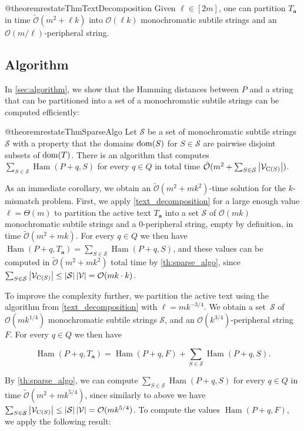 \documentclass[twoside,leqno]{article}
\let\Cref\cref
\renewcommand{\O}{\mathcal{O}}
\newcommand{\tO}{\tilde{\mathcal{O}}}
\renewcommand{\S}{\mathcal{S}}
\newcommand{\V}{\mathcal{V}}
\newcommand{\Ta}{T_\mathbf{a}}
\DeclareMathOperator*{\Ham}{Ham}
\newcommand{\absolute}[1]{\left\lvert#1\right\rvert}
\begin{document}
\begin{restatable*}{@theorem}{restateThmTextDecomposition}\label{text_decomposition}
Given $\ell \in [2m]$, one can partition $\Ta$ in time $\tO(m^2 + \ell k)$ into $\O(\ell k)$ monochromatic subtile strings and an $\O(m / \ell)$-peripheral string.
\end{restatable*}

\subsection{Algorithm}
In \cref{sec:algorithm}, we show that the Hamming distances between $P$ and a string that can be partitioned into a set of a monochromatic subtile strings can be computed efficiently: 

\begin{restatable*}{@theorem}{restateThmSparseAlgo}
\label{th:sparse_algo}
Let $\S$ be a set of monochromatic subtile strings $\S$ with a property that the domains $\operatorname*{dom}(S)$ for $S \in \S$ are pairwise disjoint subsets of $\operatorname*{dom}(T)$. There is an algorithm that computes
$\sum_{S \in \S} \Ham(P + q, S)$ for every $q \in Q$ in total time $\tO(m^2 + \sum_{S \in \S} \absolute{\V_{\getchar{S}}})$.
\end{restatable*}

As an immediate corollary, we obtain an $\tO(m^2 + mk^2)$-time solution for the $k$-mismatch problem. First, we apply \Cref{text_decomposition} for a large enough value $\ell = \Theta(m)$ to partition the active text $\Ta$ into a set $\S$ of $\O(mk)$ monochromatic subtile strings and a $0$-peripheral string, empty by definition, in time $\tO(m^2 + mk)$. For every $q \in Q$ we then have $\Ham(P + q, \Ta) = \sum_{S \in \S} \Ham(P + q, S)$, and these values can be computed in $\tO(m^2 + mk^{2})$ total time by \cref{th:sparse_algo}, since $\sum_{S \in \S} \absolute{\V_{\getchar{S}}} \le \absolute{\S} \absolute{\V} = \O(mk \cdot k)$. 

To improve the complexity further, we partition the active text using the algorithm from \Cref{text_decomposition} with $\ell = mk^{-3/4}$.
We obtain a set~$\S$ of $\O(mk^{1/4})$ monochromatic subtile strings $\S$, and an $\O(k^{3 / 4})$-peripheral string $F$. For every $q \in Q$ we then have

\[ \Ham(P + q, \Ta) = \Ham(P + q, F) + \sum_{S \in \S} \Ham(P + q, S).\]

By \cref{th:sparse_algo}, we can compute $\sum_{S \in \S} \Ham(P + q, S)$ for every $q \in Q$ in time $\tO(m^2 + mk^{5/4})$, since similarly to above we have $\sum_{S \in \S} \absolute{\V_{\getchar{S}}} \le \absolute{\S} \absolute{\V} = \O(mk^{5/4})$. To compute the values $\Ham(P + q, F)$, we apply the following result:
\end{document}
